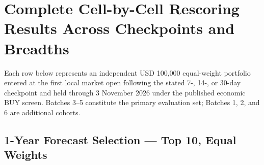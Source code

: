 \documentclass[11pt,a4paper]{article}
\numberwithin{table}{section}
\begin{document}
\section{Complete Cell-by-Cell Rescoring Results Across Checkpoints and Breadths}
\label{app:rescoring-cells}

Each row below represents an independent USD 100,000 equal-weight portfolio entered at the first local market open following the stated 7-, 14-, or 30-day checkpoint and held through 3 November 2026 under the published economic BUY screen. Batches 3--5 constitute the primary evaluation set; Batches 1, 2, and 6 are additional cohorts.

\subsection{1-Year Forecast Selection --- Top 10, Equal Weights}
\end{document}
